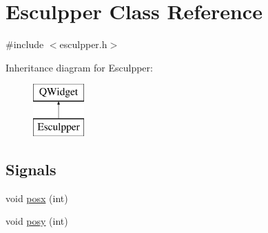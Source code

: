 \hypertarget{class_esculpper}{}\section{Esculpper Class Reference}
\label{class_esculpper}


{\ttfamily \#include $<$esculpper.\+h$>$}

Inheritance diagram for Esculpper\+:\begin{figure}[H]
\begin{center}
\leavevmode
\includegraphics[height=2.000000cm]{class_esculpper}
\end{center}
\end{figure}
\subsection*{Signals}
\begin{DoxyCompactItemize}
\item 
void \mbox{\hyperlink{class_esculpper_aa46e681d674c7b40639dc44637ed2948}{posx}} (int)
\item 
void \mbox{\hyperlink{class_esculpper_ac7e83d14fbe340f45f8984419b486c6b}{posy}} (int)
\end{DoxyCompactItemize}
